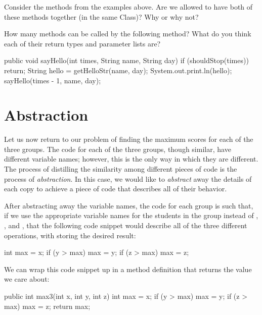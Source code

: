 \begin{example}
Consider the methods from the examples above.
Are we allowed to have both of these methods together (in the same Class)?
Why or why not?
\end{example}

\begin{example}
How many methods can be called by the following method?
What do you think each of their return types and parameter lists are?

\begin{code}
public void sayHello(int times, String name, String day) {
  if (shouldStop(times))
    return;
  String hello = getHelloStr(name, day);
  System.out.print.ln(hello);
  sayHello(times - 1, name, day);
}
\end{code}
\end{example}

\section{Abstraction}
Let us now return to our problem of finding the maximum scores for each
of the three groups.
The code for each of the three groups, though similar, have different variable names;
however, this is the only way in which they are different.
The process of distilling the similarity among different pieces of code is
the process of \emph{abstraction}.
In this case, we would like to \emph{abstract} away the details of
each copy to achieve a piece of code that describes all of their behavior.

After abstracting away the variable names, the code for each group is such that,
if we use the appropriate variable names for the students in the group
instead of , , and , that the following code snippet
would describe all of the three different operations, with
 storing the desired result:
\begin{code}
int max = x;
if (y > max) {
  max = y; 
}
if (z > max) {
  max = z;
}
\end{code}
We can wrap this code snippet up in a method definition
that returns the value we care about:
\begin{code}
public int max3(int x, int y, int z) {
  int max = x;
  if (y > max) {
    max = y;
  }
  if (z > max) {
    max = z;
  }
  return max;
}
\end{code}

